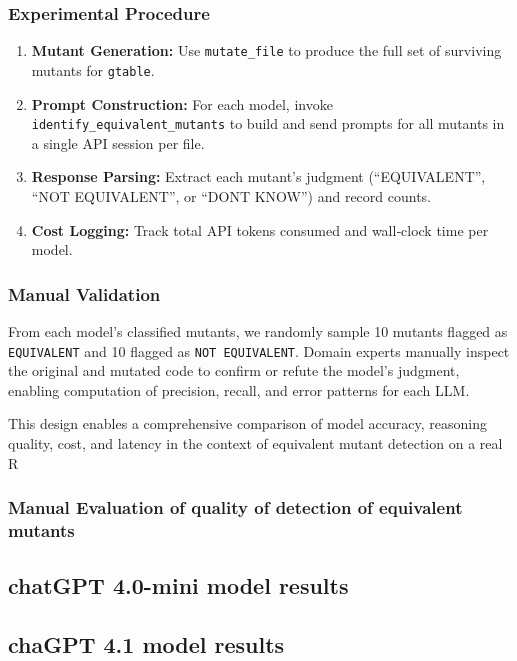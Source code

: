 \subsubsection{Experimental Procedure}
\begin{enumerate}
  \item \textbf{Mutant Generation:} Use \texttt{mutate\_file} to produce the full set of surviving mutants for \texttt{gtable}.  
  \item \textbf{Prompt Construction:} For each model, invoke \texttt{identify\_equivalent\_mutants} to build and send prompts for all mutants in a single API session per file.  
  \item \textbf{Response Parsing:} Extract each mutant’s judgment (“EQUIVALENT”, “NOT EQUIVALENT”, or “DONT KNOW”) and record counts.  
  \item \textbf{Cost Logging:} Track total API tokens consumed and wall‐clock time per model.
\end{enumerate}

\subsubsection{Manual Validation}
From each model’s classified mutants, we randomly sample 10 mutants flagged as \texttt{EQUIVALENT} and 10 flagged as \texttt{NOT EQUIVALENT}.  Domain experts manually inspect the original and mutated code to confirm or refute the model’s judgment, enabling computation of precision, recall, and error patterns for each LLM.

This design enables a comprehensive comparison of model accuracy, reasoning quality, cost, and latency in the context of equivalent mutant detection on a real R

\subsubsection{Manual Evaluation of quality of detection of equivalent mutants}



\subsection{chatGPT 4.0-mini model results}

\subsection{chaGPT 4.1 model results}

